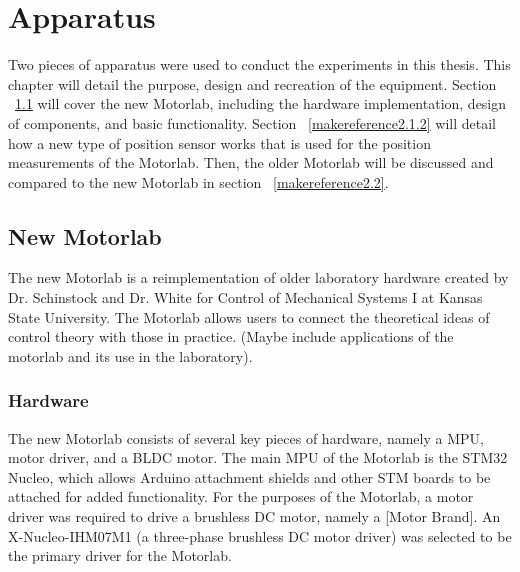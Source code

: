
\cleardoublepage


\chapter{Apparatus}
\label{makereference2}

Two pieces of apparatus were used to conduct the experiments in this thesis. This chapter will detail the purpose, design and recreation of the equipment. Section ~\ref{makereference2.1} will cover the new Motorlab, including the hardware implementation, design of components, and basic functionality. Section ~\ref{makereference2.1.2} will detail how a new type of position sensor works that is used for the position measurements of the Motorlab. Then, the older Motorlab will be discussed and compared to the new Motorlab in section ~\ref{makereference2.2}.

\section{New Motorlab}
\label{makereference2.1} 

The new Motorlab is a reimplementation of older laboratory hardware created by Dr. Schinstock and Dr. White for Control of Mechanical Systems I at Kansas State University. The Motorlab allows users to connect the theoretical ideas of control theory with those in practice. (Maybe include applications of the motorlab and its use in the laboratory).

\subsection{Hardware}
\label{makereference2.1.1} 

The new Motorlab consists of several key pieces of hardware, namely a \ac{MPU}, motor driver, and a \ac{BLDC} motor. The main MPU of the Motorlab is the STM32 Nucleo, which allows Arduino attachment shields and other STM boards to be attached for added functionality. For the purposes of the Motorlab, a motor driver was required to drive a brushless DC motor, namely a [Motor Brand]. An X-Nucleo-IHM07M1 (a three-phase brushless DC motor driver) was selected to be the primary driver for the Motorlab.

